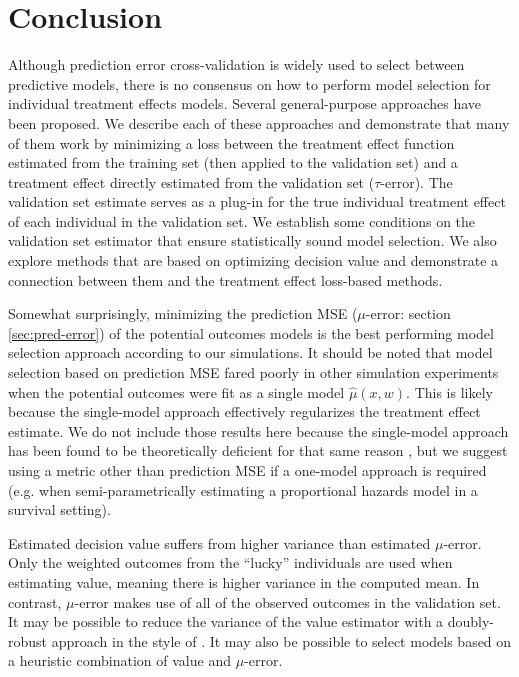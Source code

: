 \section{Conclusion}
\label{conclusion}

Although prediction error cross-validation is widely used to select between predictive models, there is no consensus on how to perform model selection for individual treatment effects models. Several general-purpose approaches have been proposed. We describe each of these approaches and demonstrate that many of them work by minimizing a loss between the treatment effect function estimated from the training set (then applied to the validation set) and a treatment effect directly estimated from the validation set ($\tau$-error). The validation set estimate serves as a plug-in for the true individual treatment effect of each individual in the validation set. We establish some conditions on the validation set estimator that ensure statistically sound model selection. We also explore methods that are based on optimizing decision value and demonstrate a connection between them and the treatment effect loss-based methods. 

Somewhat surprisingly, minimizing the prediction MSE ($\mu$-error: section \ref{sec:pred-error}) of the potential outcomes models is the best performing model selection approach according to our simulations. It should be noted that model selection based on prediction MSE fared poorly in other simulation experiments when the potential outcomes were fit as a single model $\hat\mu(x,w)$. This is likely because the single-model approach effectively regularizes the treatment effect estimate. We do not include those results here because the single-model approach has been found to be theoretically deficient for that same reason \cite{Alaa:tj}, but we suggest using a metric other than prediction MSE if a one-model approach is required (e.g. when semi-parametrically estimating a proportional hazards model in a survival setting).

Estimated decision value suffers from higher variance than estimated $\mu$-error. Only the weighted outcomes from the ``lucky'' individuals are used when estimating value, meaning there is higher variance in the computed mean. In contrast, $\mu$-error makes use of all of the observed outcomes in the validation set. It may be possible to reduce the variance of the value estimator with a doubly-robust approach in the style of \citet{Zhang:2012em}. It may also be possible to select models based on a heuristic combination of value and $\mu$-error.

